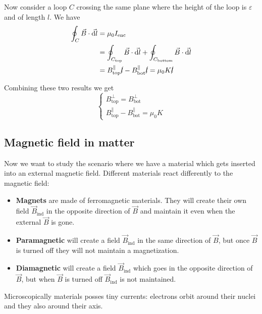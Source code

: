 \documentclass[12pt]{extarticle}
\begin{document}
Now consider a loop $C$ crossing the same plane where the height of the loop is $\varepsilon$ and of length $l$.
We have
\begin{align}
	\oint_C \vec B \cdot \vec{\dd l} & = \mu_0 I_\text{enc}                                                                             \\
	                                 & = \oint_{C_\text{top}}\vec B \cdot \vec{\dd l} + \oint_{C_\text{bottom}}\vec B \cdot \vec{\dd l} \\
	                                 & = B^{\parallel}_\text{top} \cancel l - B^{\parallel}_\text{bot} \cancel l = \mu_0 K \cancel l
\end{align}

Combining these two results we get
\begin{equation}
	\begin{cases}
		B_\text{top}^{\perp} = B_\text{bot}^{\perp} \\
		B^{\parallel}_\text{top} - B^{\parallel}_\text{bot} = \mu_0 K
	\end{cases}
\end{equation}

\subsection{Magnetic field in matter}
Now we want to study the scenario where we have a material which gets inserted into an external magnetic field.
Different materials react differently to the magnetic field:
\begin{itemize}
	\item \textbf{Magnets} are made of ferromagnetic materials.
	      They will create their own field $\vec B_\text{ind}$
	      in the opposite direction of $\vec B$ and maintain it even when the external $\vec B$ is gone.
	\item \textbf{Paramagnetic} will create a field
	      $\vec B_\text{ind}$ in the same direction of $\vec B$,
	      but once $\vec B$ is turned off they will not maintain a magnetization.
	\item \textbf{Diamagnetic} will create a field $\vec B_\text{ind}$
	      which goes in the opposite direction of $\vec B$,
	      but when $\vec B$ is turned off $\vec B_\text{ind}$ is not maintained.
\end{itemize}

Microscopically materials posses tiny currents:
electrons orbit around their nuclei and they also  around their axis.
\end{document}
